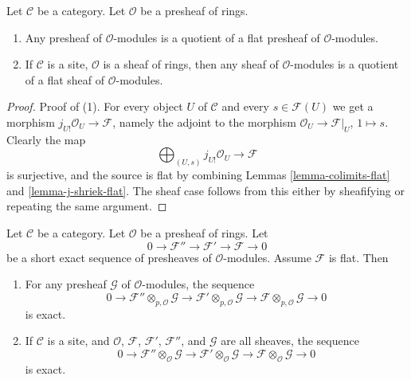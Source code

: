 \begin{lemma}
\label{lemma-module-quotient-flat}
Let $\mathcal{C}$ be a category.
Let $\mathcal{O}$ be a presheaf of rings.
\begin{enumerate}
\item Any presheaf of $\mathcal{O}$-modules is a quotient of
a flat presheaf of $\mathcal{O}$-modules.
\item If $\mathcal{C}$ is a site, $\mathcal{O}$ is a sheaf of rings,
then any sheaf of $\mathcal{O}$-modules is a quotient of
a flat sheaf of $\mathcal{O}$-modules.
\end{enumerate}
\end{lemma}

\begin{proof}
Proof of (1). For every object $U$ of $\mathcal{C}$ and every
$s \in \mathcal{F}(U)$ we get a morphism
$j_{U!}\mathcal{O}_U \to \mathcal{F}$, namely the adjoint to
the morphism $\mathcal{O}_U \to \mathcal{F}|_U$, $1 \mapsto s$.
Clearly the map
$$
\bigoplus\nolimits_{(U, s)} j_{U!}\mathcal{O}_U
\longrightarrow
\mathcal{F}
$$
is surjective, and the source is flat by combining Lemmas
\ref{lemma-colimits-flat} and \ref{lemma-j-shriek-flat}.
The sheaf case follows from this either by
sheafifying or repeating the same argument.
\end{proof}

\begin{lemma}
\label{lemma-flat-tor-zero}
Let $\mathcal{C}$ be a category.
Let $\mathcal{O}$ be a presheaf of rings.
Let
$$
0 \to \mathcal{F}'' \to \mathcal{F}' \to \mathcal{F} \to 0
$$
be a short exact sequence of presheaves of $\mathcal{O}$-modules.
Assume $\mathcal{F}$ is flat. Then
\begin{enumerate}
\item For any presheaf $\mathcal{G}$
of $\mathcal{O}$-modules, the sequence
$$
0 \to
\mathcal{F}'' \otimes_{p, \mathcal{O}} \mathcal{G} \to
\mathcal{F}' \otimes_{p, \mathcal{O}} \mathcal{G} \to
\mathcal{F} \otimes_{p, \mathcal{O}} \mathcal{G} \to 0
$$
is exact.
\item If $\mathcal{C}$ is a site, and $\mathcal{O}$,
$\mathcal{F}$, $\mathcal{F}'$, $\mathcal{F}''$, and
$\mathcal{G}$ are all sheaves, the sequence
$$
0 \to
\mathcal{F}'' \otimes_\mathcal{O} \mathcal{G} \to
\mathcal{F}' \otimes_\mathcal{O} \mathcal{G} \to
\mathcal{F} \otimes_\mathcal{O} \mathcal{G} \to 0
$$
is exact.
\end{enumerate}
\end{lemma}

